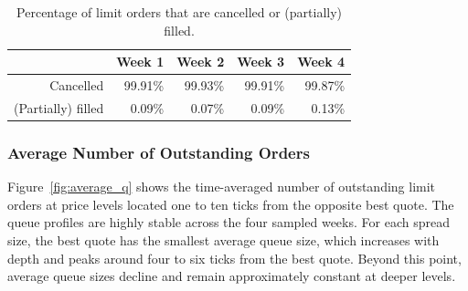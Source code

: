 \documentclass[11pt]{article}
\begin{document}
\begin{table}[h]
    \centering
        \begin{tabular}{r r r r r}\toprule
            & Week 1 & Week 2 & Week 3 & Week 4\\ \midrule
         Cancelled & 99.91\% & 99.93\% & 99.91\% & 99.87\% \\
         (Partially) filled & 0.09\% & 0.07\% & 0.09\% & 0.13\% \\ \bottomrule
       \end{tabular}
  
   \caption{Percentage of limit orders that are cancelled or (partially) filled.}
    \label{tab: cancel_percentage}
\end{table}

\subsubsection{Average Number of Outstanding Orders}\label{sec:avg_outstanding}

Figure~\ref{fig:average_q} shows the time-averaged number of outstanding limit orders at price levels located one to ten ticks from the opposite best quote. The queue profiles are highly stable across the four sampled weeks. For each spread size, the best quote has the smallest average queue size, which increases with depth and peaks around four to six ticks from the best quote. Beyond this point, average queue sizes decline and remain approximately constant at deeper levels.
\end{document}
